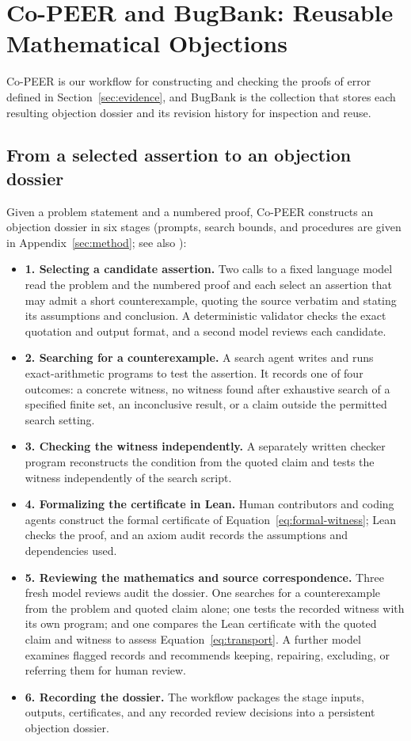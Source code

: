 \section{Co-PEER and BugBank: Reusable Mathematical Objections}
\label{sec:resource}
\label{sec:resource-audit}
Co-PEER is our workflow for constructing and checking the proofs of error defined in Section~\ref{sec:evidence}, and BugBank is the collection that stores each resulting objection dossier and its revision history for inspection and reuse.

\subsection{From a selected assertion to an objection dossier}
\label{sec:pipeline}
Given a problem statement and a numbered proof, Co-PEER constructs an objection dossier in six stages (prompts, search bounds, and procedures are given in Appendix~\ref{sec:method}; see also \citealp{mcconnell2011certifying,moura2021lean,mathlib2020}):
\begin{itemize}[leftmargin=*,itemsep=2pt,topsep=3pt]
\item \textbf{1. Selecting a candidate assertion.} Two calls to a fixed language model read the problem and the numbered proof and each select an assertion that may admit a short counterexample, quoting the source verbatim and stating its assumptions and conclusion. A deterministic validator checks the exact quotation and output format, and a second model reviews each candidate.
\item \textbf{2. Searching for a counterexample.} A search agent writes and runs exact-arithmetic programs to test the assertion. It records one of four outcomes: a concrete witness, no witness found after exhaustive search of a specified finite set, an inconclusive result, or a claim outside the permitted search setting.
\item \textbf{3. Checking the witness independently.} A separately written checker program reconstructs the condition from the quoted claim and tests the witness independently of the search script.
\item \textbf{4. Formalizing the certificate in Lean.} Human contributors and coding agents construct the formal certificate of Equation~\eqref{eq:formal-witness}; Lean checks the proof, and an axiom audit records the assumptions and dependencies used.
\item \textbf{5. Reviewing the mathematics and source correspondence.} Three fresh model reviews audit the dossier. One searches for a counterexample from the problem and quoted claim alone; one tests the recorded witness with its own program; and one compares the Lean certificate with the quoted claim and witness to assess Equation~\eqref{eq:transport}. A further model examines flagged records and recommends keeping, repairing, excluding, or referring them for human review.
\item \textbf{6. Recording the dossier.} The workflow packages the stage inputs, outputs, certificates, and any recorded review decisions into a persistent objection dossier.
\end{itemize}

